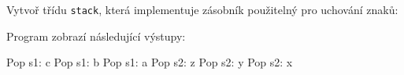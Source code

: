 \begin{mdframed}[style=mdexam]
  \begin{example}\label{cpp:exam006}
    Vytvoř třídu \lstinline[style=luaCPPText]!stack!, která implementuje zásobník použitelný pro
    uchování znaků:
    
    Program zobrazí následující výstupy:
    \begin{mdframed}[style=mdmsdos]
    Pop s1: c\newline
    Pop s1: b\newline
    Pop s1: a\newline
    Pop s2: z\newline
    Pop s2: y\newline
    Pop s2: x
    \end{mdframed}
  \end{example}
\end{mdframed}